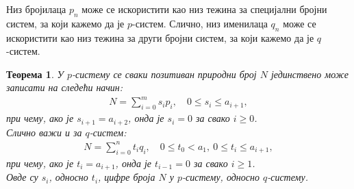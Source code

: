 \documentclass[a4paper]{article}
\newtheorem{theorem}{Теорема}
\begin{document}
Низ бројилаца $ p_{n} $ може се искористити као низ тежина за специјални бројни систем, за који кажемо да је $ p $-систем. Слично, низ именилаца $ q_{n} $ може се искористити као низ тежина за други бројни систем, за који кажемо да је $ q $-систем.

\begin{theorem}
	\label{thm:p_q_sistemi}
	У $ p $-систему се сваки позитиван природни број $ N $ јединствено може записати на следећи начин:	
	\begin{eqnarray}
		\label{p_sistem} N = \sum_{i=0}^{m} s_{i}p_{i},\quad 0 \le s_{i} \le a_{i+1},
	\end{eqnarray}	
	при чему, ако је $ s_{i+1} = a_{i+2} $, онда је $ s_{i} = 0  $ за свако $ i \ge 0 $.\\	
	Слично важи и за $ q $-систем:	
	\begin{eqnarray}
		\label{q_sistem} N = \sum_{i=0}^{n} t_{i}q_{i},\quad 0 \le t_{0} < a_{1},\ 0 \le t_{i} \le a_{i+1},
	\end{eqnarray}
	при чему, ако је $ t_{i} = a_{i+1} $, онда је $ t_{i-1} = 0 $ за свако $ i \ge 1 $.\\
	Овде су $ s_{i} $, односно $ t_{i} $, цифре броја $ N $  у $ p $-систему, односно $ q $-систему.
\end{theorem} 
\end{document}
